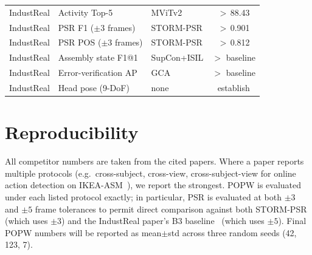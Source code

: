 \documentclass[11pt,a4paper]{article}
\newcommand{\popw}{POPW}
\newcommand{\ikea}{IKEA-ASM}
\newcommand{\industreal}{IndustReal}
\begin{document}
\begin{table}[!htbp]
\begin{tabular}{l l l c}
\industreal{}   & Activity Top-5                  & MViTv2           & $>$\,88.43 \\
\industreal{}   & PSR F1 ($\pm 3$ frames)         & STORM-PSR        & $>$\,0.901 \\
\industreal{}   & PSR POS ($\pm 3$ frames)        & STORM-PSR        & $>$\,0.812 \\
\industreal{}   & Assembly state F1@1             & SupCon+ISIL      & $>$ baseline \\
\industreal{}   & Error-verification AP           & GCA              & $>$ baseline \\
\industreal{}   & Head pose (9-DoF)               & none             & establish \\
\bottomrule
\end{tabular}
\end{table}

\FloatBarrier
\section{Reproducibility}
\label{sec:repro}

All competitor numbers are taken from the cited papers. Where a paper reports multiple
protocols (e.g.\ cross-subject, cross-view, cross-subject-view for online action detection
on \ikea{}~\cite{xie2025ptma}), we report the strongest. \popw{} is evaluated under each
listed protocol exactly; in particular,
PSR is evaluated at both $\pm 3$ and $\pm 5$ frame tolerances to permit direct comparison
against both STORM-PSR~\cite{schoonbeek2025storm} (which uses $\pm 3$) and the
\industreal{} paper's B3 baseline~\cite{schoonbeek2024industreal} (which uses $\pm 5$).
Final \popw{} numbers will be reported as mean$\pm$std across three random seeds
(42, 123, 7).
\end{document}
